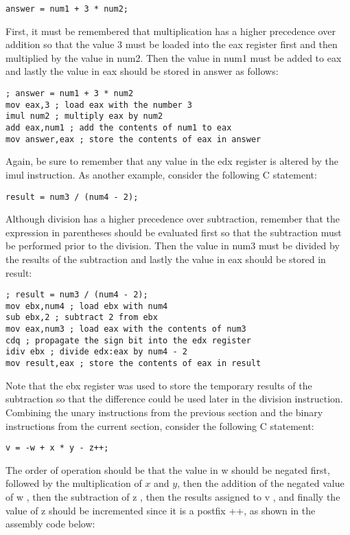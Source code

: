 \documentclass[10pt]{article}
\begin{document}
\begin{verbatim}
answer = num1 + 3 * num2;
\end{verbatim}

First, it must be remembered that multiplication has a higher precedence over addition so that the value 3 must be loaded into the eax register first and then multiplied by the value in num2. Then the value in num1 must be added to eax and lastly the value in eax should be stored in answer as follows:

\begin{verbatim}
; answer = num1 + 3 * num2
mov eax,3 ; load eax with the number 3
imul num2 ; multiply eax by num2
add eax,num1 ; add the contents of num1 to eax
mov answer,eax ; store the contents of eax in answer
\end{verbatim}

Again, be sure to remember that any value in the edx register is altered by the imul instruction. As another example, consider the following C statement:

\begin{verbatim}
result = num3 / (num4 - 2);
\end{verbatim}

Although division has a higher precedence over subtraction, remember that the expression in parentheses should be evaluated first so that the subtraction must be performed prior to the division. Then the value in num3 must be divided by the results of the subtraction and lastly the value in eax should be stored in result:

\begin{verbatim}
; result = num3 / (num4 - 2);
mov ebx,num4 ; load ebx with num4
sub ebx,2 ; subtract 2 from ebx
mov eax,num3 ; load eax with the contents of num3
cdq ; propagate the sign bit into the edx register
idiv ebx ; divide edx:eax by num4 - 2
mov result,eax ; store the contents of eax in result
\end{verbatim}

Note that the ebx register was used to store the temporary results of the subtraction so that the difference could be used later in the division instruction. Combining the unary instructions from the previous section and the binary instructions from the current section, consider the following C statement:

\begin{verbatim}
v = -w + x * y - z++;
\end{verbatim}

The order of operation should be that the value in w should be negated first, followed by the multiplication of $x$ and $y$, then the addition of the negated value of w , then the subtraction of z , then the results assigned to v , and finally the value of z should be incremented since it is a postfix ++, as shown in the assembly code below:
\end{document}

